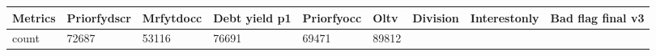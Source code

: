 \begin{longtable}[]{@{}lllllllll@{}}
\toprule
\begin{minipage}[b]{0.05\columnwidth}\raggedright
Metrics\strut
\end{minipage} & \begin{minipage}[b]{0.08\columnwidth}\raggedright
Priorfydscr\strut
\end{minipage} & \begin{minipage}[b]{0.09\columnwidth}\raggedright
Mrfytdocc\strut
\end{minipage} & \begin{minipage}[b]{0.09\columnwidth}\raggedright
Debt yield p1\strut
\end{minipage} & \begin{minipage}[b]{0.08\columnwidth}\raggedright
Priorfyocc\strut
\end{minipage} & \begin{minipage}[b]{0.09\columnwidth}\raggedright
Oltv\strut
\end{minipage} & \begin{minipage}[b]{0.09\columnwidth}\raggedright
Division\strut
\end{minipage} & \begin{minipage}[b]{0.08\columnwidth}\raggedright
Interestonly\strut
\end{minipage} & \begin{minipage}[b]{0.11\columnwidth}\raggedright
Bad flag final v3\strut
\end{minipage}\tabularnewline
\midrule
\endhead
\begin{minipage}[t]{0.05\columnwidth}\raggedright
count\strut
\end{minipage} & \begin{minipage}[t]{0.08\columnwidth}\raggedright
72687\strut
\end{minipage} & \begin{minipage}[t]{0.09\columnwidth}\raggedright
53116\strut
\end{minipage} & \begin{minipage}[t]{0.09\columnwidth}\raggedright
76691\strut
\end{minipage} & \begin{minipage}[t]{0.08\columnwidth}\raggedright
69471\strut
\end{minipage} & \begin{minipage}[t]{0.09\columnwidth}\raggedright
89812\strut
\end{minipage} & \begin{minipage}[t]{0.09\columnwidth}\raggedright

\end{minipage}
\end{longtable}
